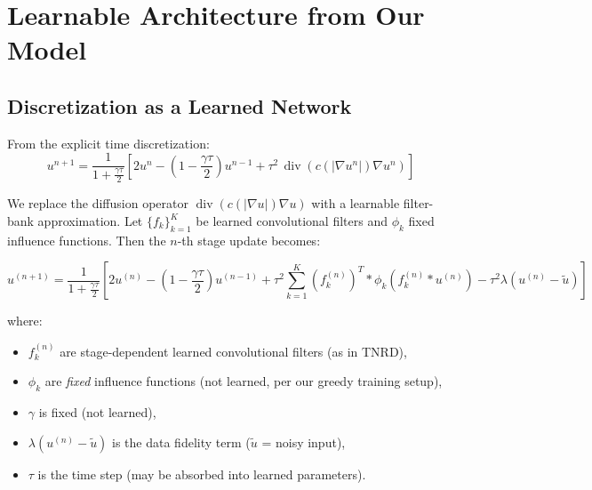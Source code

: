 \documentclass{report}
\begin{document}
\section*{Learnable Architecture from Our Model}

\subsection*{Discretization as a Learned Network}

From the explicit time discretization:
\begin{equation}
	u^{n+1} = \frac{1}{1 + \frac{\gamma\tau}{2}}\left[
	2u^n - \left(1 - \frac{\gamma\tau}{2}\right)u^{n-1}
	+ \tau^2\, \operatorname{div}(c(|\nabla u^n|)\nabla u^n)
	\right]
\end{equation}

We replace the diffusion operator $\operatorname{div}(c(|\nabla u|)\nabla u)$ with a learnable filter-bank approximation. Let $\{f_k\}_{k=1}^K$ be learned convolutional filters and $\phi_k$ fixed influence functions. Then the $n$-th stage update becomes:

\begin{equation}
	u^{(n+1)} = \frac{1}{1 + \frac{\gamma\tau}{2}}\left[
	2u^{(n)} - \left(1 - \frac{\gamma\tau}{2}\right)u^{(n-1)}
	+ \tau^2 \sum_{k=1}^{K} \left(f_k^{(n)}\right)^T * \phi_k\!\left(f_k^{(n)} * u^{(n)}\right)
	- \tau^2\lambda\left(u^{(n)} - \tilde{u}\right)
	\right]
\end{equation}

where:
\begin{itemize}
	\item $f_k^{(n)}$ are stage-dependent learned convolutional filters (as in TNRD),
	\item $\phi_k$ are \emph{fixed} influence functions (not learned, per our greedy training setup),
	\item $\gamma$ is fixed (not learned),
	\item $\lambda(u^{(n)} - \tilde{u})$ is the data fidelity term ($\tilde{u}$ = noisy input),
	\item $\tau$ is the time step (may be absorbed into learned parameters).
\end{itemize}

\end{document}
